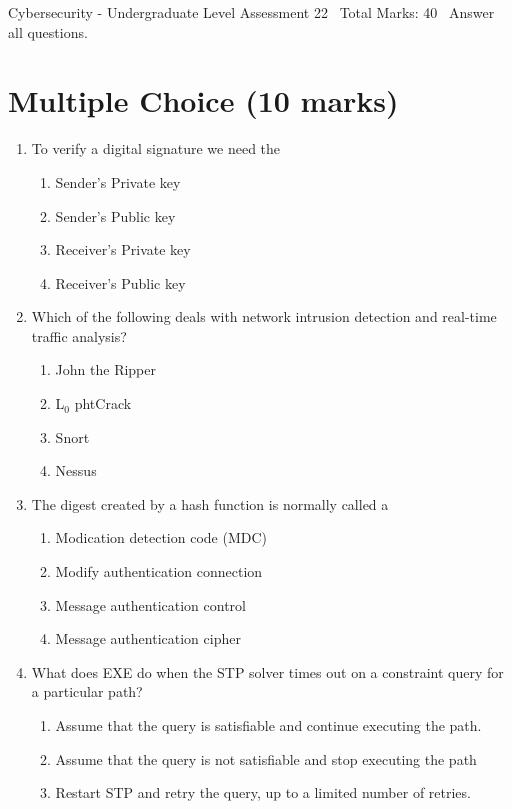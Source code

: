 \documentclass[12pt]{article}
\begin{document}
\begin{center}
Cybersecurity - Undergraduate Level Assessment 22 \
Total Marks: 40 \
Answer all questions.
\end{center}

\section*{Multiple Choice (10 marks)}
\begin{enumerate}[label=\arabic*.]
\item To verify a digital signature we need the
\begin{enumerate}[label=(\alph*)]
    \item Sender's Private key
    \item Sender's Public key
    \item Receiver's Private key
    \item Receiver's Public key
\end{enumerate}
\item Which of the following deals with network intrusion detection and real-time traffic analysis?
\begin{enumerate}[label=(\alph*)]
    \item John the Ripper
    \item L$_{0}$ phtCrack
    \item Snort
    \item Nessus
\end{enumerate}
\item The digest created by a hash function is normally called a
\begin{enumerate}[label=(\alph*)]
    \item Modication detection code (MDC)
    \item Modify authentication connection
    \item Message authentication control
    \item Message authentication cipher
\end{enumerate}
\item What does EXE do when the STP solver times out on a constraint query for a particular path?
\begin{enumerate}[label=(\alph*)]
    \item Assume that the query is satisfiable and continue executing the path.
    \item Assume that the query is not satisfiable and stop executing the path
    \item Restart STP and retry the query, up to a limited number of retries.

\end{enumerate}
\end{enumerate}
\end{document}
